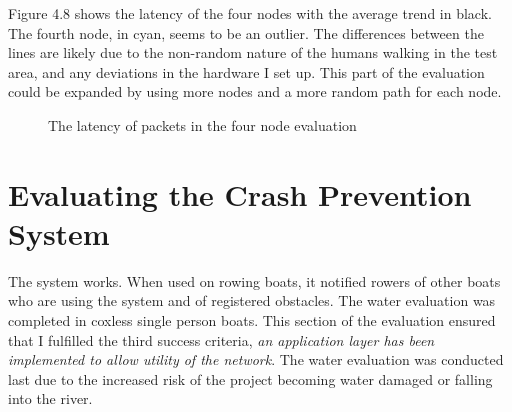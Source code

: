 \documentclass[12pt,a4paper]{report}
\begin{document}
Figure 4.8 shows the latency of the four nodes with the average trend in black. The fourth node, in cyan, seems to be an outlier. The differences between the lines are likely due to the non-random nature of the humans walking in the test area, and any deviations in the hardware I set up. This part of the evaluation could be expanded by using more nodes and a more random path for each node. 
\begin{table}[h]
\begin{center}
\end{center}
\caption{Results from the four node evaluation and comparison to other papers}
\end{table}  

\begin{figure}[h]
\begin{center}

\end{center}
\caption{The latency of packets in the four node evaluation}
\end{figure}

\section{Evaluating the Crash Prevention System}
The system works. When used on rowing boats, it notified rowers of other boats who are using the system and of registered obstacles. The water evaluation was completed in coxless single person boats. This section of the evaluation ensured that I fulfilled the third success criteria, \emph{an application layer has been implemented to allow utility of the network}. The water evaluation was conducted last due to the increased risk of the project becoming water damaged or falling into the river. \\ 
\end{document}
